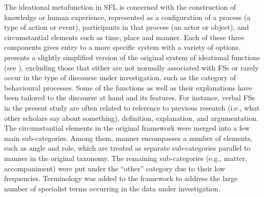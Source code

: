 \documentclass[output=paper]{langscibook}
\begin{document}
\hspace*{-1.6mm}The ideational metafunction in SFL is concerned with the construction of knowledge or human experience, represented as a configuration of a process (a type of action or event), participants in that process (an actor or object), and circumstantial elements such as time, place and manner. Each of these three components gives entry to a more specific system with a variety of options.  presents a slightly simplified version of the original system of ideational functions (see \citealt{Halliday2014matthiessen}), excluding those that either are not normally associated with FSs or rarely occur in the type of discourse under investigation, such as the category of behavioural processes. Some of the functions as well as their explanations have been tailored to the discourse at hand and its features. For instance, verbal FSs in the present study are often related to reference to previous research (i.e., what other scholars say about something), definition, explanation, and argumentation. The circumstantial elements in the original framework were merged into a few main sub-categories. Among them, manner encompasses a number of elements, such as angle and role, which are treated as separate sub-categories parallel to manner in the original taxonomy. The remaining sub-categories (e.g., matter, accompaniment) were put under the ``other'' category due to their low frequencies. Terminology was added to the framework to address the large number of specialist terms occurring in the data under investigation.
\end{document}
